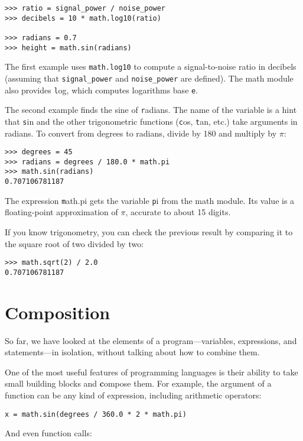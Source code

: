 \documentclass[
DIV=11,
fontsize=13,
twoside,
headinclude=false,
titlepage=firstiscover,
abstract=true,
headsepline=true,
footsepline=true,
chapterprefix=true, %
headings=big,
bibliography=totoc,%
captions=tableheading
]{scrbook}
\theoremstyle{definition}
\begin{document}
\begin{lstlisting}
>>> ratio = signal_power / noise_power
>>> decibels = 10 * math.log10(ratio)

>>> radians = 0.7
>>> height = math.sin(radians)
\end{lstlisting}
%
The first example uses \verb"math.log10" to compute 
a signal-to-noise ratio in decibels (assuming that \verb"signal_power" and
\verb"noise_power" are defined).  The math module also provides {\texttt log},
which computes logarithms base {\texttt e}.

The second example finds the sine of {\texttt radians}.  The name of the
variable is a hint that {\texttt sin} and the other trigonometric
functions ({\texttt cos}, {\texttt tan}, etc.)  take arguments in radians. To
convert from degrees to radians, divide by 180 and multiply by
$\pi$:

\begin{lstlisting}
>>> degrees = 45
>>> radians = degrees / 180.0 * math.pi
>>> math.sin(radians)
0.707106781187
\end{lstlisting}
%
The expression {\texttt math.pi} gets the variable {\texttt pi} from the math
module.  Its value is a floating-point approximation
of $\pi$, accurate to about 15 digits.

If you know
trigonometry, you can check the previous result by comparing it to
the square root of two divided by two:

\begin{lstlisting}
>>> math.sqrt(2) / 2.0
0.707106781187
\end{lstlisting}
%

\section{Composition}

So far, we have looked at the elements of a program---variables,
expressions, and statements---in isolation, without talking about how to
combine them.

One of the most useful features of programming languages is their
ability to take small building blocks and {\textbf compose} them.  For
example, the argument of a function can be any kind of expression,
including arithmetic operators:

\begin{lstlisting}
x = math.sin(degrees / 360.0 * 2 * math.pi)
\end{lstlisting}
%
And even function calls:
\end{document}
